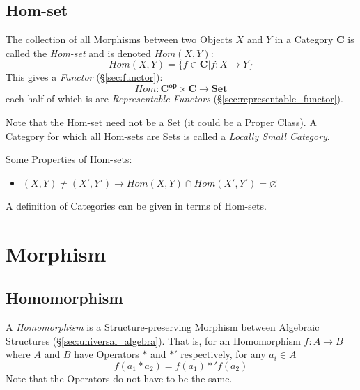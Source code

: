 \subsection{Hom-set}\label{sec:hom_set}

The collection of all Morphisms between two Objects $X$ and $Y$ in a
Category $\mathbf{C}$ is called the \emph{Hom-set} and is denoted
$Hom(X,Y)$:
\[
    Hom(X,Y) = \{f \in \mathbf{C} | f : X \rightarrow Y\}
\]
This gives a \emph{Functor} (\S\ref{sec:functor}):
\[
    Hom : \mathbf{C^{op}} \times \mathbf{C} \rightarrow \mathbf{Set}
\]
each half of which is are \emph{Representable Functors}
(\S\ref{sec:representable_functor}).

Note that the Hom-set need not be a Set (it could be a Proper Class).
A Category for which all Hom-sets are Sets is called a \emph{Locally
  Small Category}.



Some Properties of Hom-sets:
\begin{itemize}
\item $ (X,Y) \neq (X',Y') \rightarrow
  Hom(X,Y) \cap Hom(X',Y') = \varnothing$
\end{itemize}

A definition of Categories can be given in terms of Hom-sets. %



\section{Morphism}\label{sec:morphism}

\subsection{Homomorphism}\label{sec:homomorphism}

A \emph{Homomorphism} is a Structure-preserving Morphism between
Algebraic Structures (\S\ref{sec:universal_algebra}). That is, for
an Homomorphism $f : A \rightarrow B$ where $A$ and $B$ have Operators
$*$ and $*'$ respectively, for any $a_i \in A$
\[
    f(a_1 * a_2) = f(a_1) *' f(a_2)
\]
Note that the Operators do not have to be the same.



